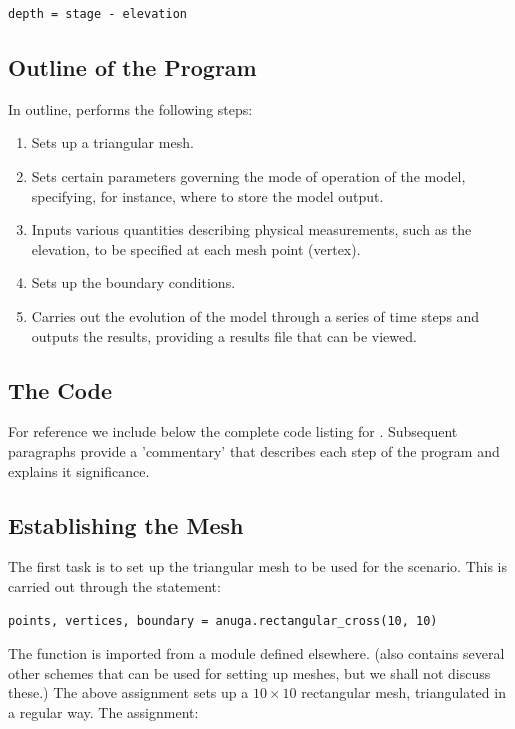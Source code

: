 \documentclass{manual}
\begin{document}
\begin{verbatim}
depth = stage - elevation
\end{verbatim}

\subsection{Outline of the Program}

In outline,  performs the following steps:
\begin{enumerate}
   \item Sets up a triangular mesh.
   \item Sets certain parameters governing the mode of
         operation of the model, specifying, for instance,
         where to store the model output.
   \item Inputs various quantities describing physical measurements, such
         as the elevation, to be specified at each mesh point (vertex).
   \item Sets up the boundary conditions.
   \item Carries out the evolution of the model through a series of time
         steps and outputs the results, providing a results file that can
         be viewed.
\end{enumerate}

\subsection{The Code}

For reference we include below the complete code listing for
. Subsequent paragraphs provide a
'commentary' that describes each step of the program and explains it
significance.

\label{ref:runup_py_code}


\subsection{Establishing the Mesh}

The first task is to set up the triangular mesh to be used for the
scenario. This is carried out through the statement:

\begin{verbatim}
points, vertices, boundary = anuga.rectangular_cross(10, 10)
\end{verbatim}

The function  is imported from a module
 defined elsewhere. (\anuga also contains
several other schemes that can be used for setting up meshes, but we
shall not discuss these.) The above assignment sets up a $10 \times
10$ rectangular mesh, triangulated in a regular way. The assignment:
\end{document}
